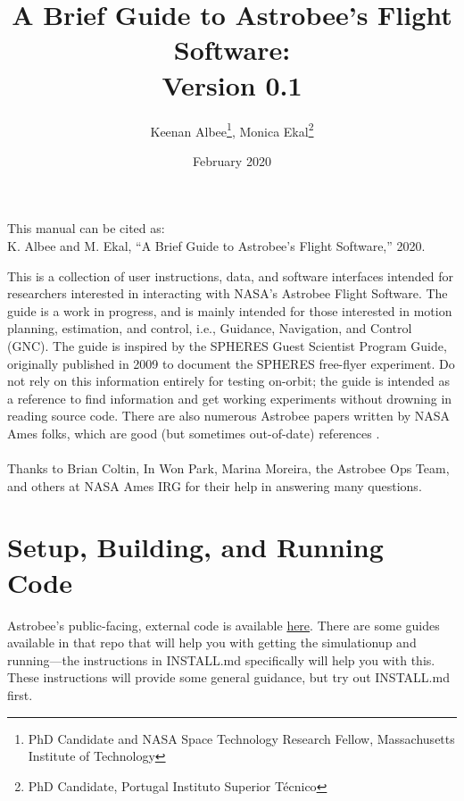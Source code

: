 \documentclass{article}
\begin{document}
\vspace{2in}
\title{A Brief Guide to Astrobee's Flight Software:\\
        Version 0.1}
\author{Keenan Albee\footnote{PhD Candidate and NASA Space Technology Research Fellow, Massachusetts Institute of Technology}, Monica Ekal\footnote{PhD Candidate, Portugal Instituto Superior Técnico}}
\date{February 2020}
\maketitle
\vfill
\begin{center}
This manual can be cited as:\\
K. Albee and M. Ekal, “A Brief Guide to Astrobee’s Flight Software,” 2020.
\end{center}
\newpage
This is a collection of user instructions, data, and software interfaces intended for researchers interested in interacting with NASA's Astrobee Flight Software. The guide is a work in progress, and is mainly intended for those interested in motion planning, estimation, and control, i.e., Guidance, Navigation, and Control (GNC). The guide is inspired by the SPHERES Guest Scientist Program Guide, originally published in 2009 to document the SPHERES free-flyer experiment. Do not rely on this information entirely for testing on-orbit; the guide is intended as a reference to find information and get working experiments without drowning in reading source code. There are also numerous Astrobee papers written by NASA Ames folks, which are good (but sometimes out-of-date) references \cite{Park2017a} \cite{Smith2016} \cite{Watterson2016} \cite{Fluckiger} \cite{Coltin2016a} \cite{Kim2017} \cite{Bualat2015} \cite{Lee2018}.
\\
\\
\indent Thanks to Brian Coltin, In Won Park, Marina Moreira, the Astrobee Ops Team, and others at NASA Ames IRG for their help in answering many questions.
\newpage

\tableofcontents



\newpage

\section{Setup, Building, and Running Code} 

Astrobee's public-facing, external code is available \href{https://github.com/nasa/astrobee}{here}. There are some guides available in that repo that will help you with getting the simulationup and running---the instructions in INSTALL.md specifically will help you with this. These instructions will provide some general guidance, but try out INSTALL.md first.
\end{document}

